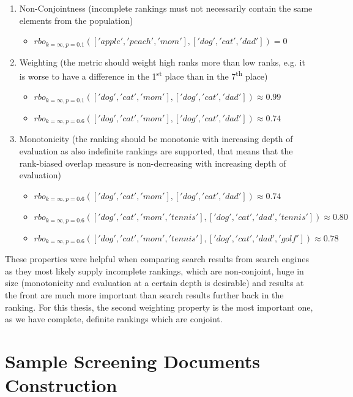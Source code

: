 \documentclass[draft,final]{thesisclass} %
\begin{document}
\begin{enumerate}
\item Non-Conjointness (incomplete rankings must not necessarily contain the same elements from the population)
\begin{itemize}
    \item $rbo_{k=\infty,p=0.1}(['apple','peach','mom'],['dog','cat','dad']) = 0$
\end{itemize}
\item Weighting (the metric should weight high ranks more than low ranks, e.g. it is worse to have a difference in the 1\textsuperscript{st} place than in the 7\textsuperscript{th} place)
\begin{itemize}
    \item $rbo_{k=\infty,p=0.1}(['dog','cat','mom'],['dog','cat','dad']) \approx 0.99$
    \item $rbo_{k=\infty,p=0.6}(['dog','cat','mom'],['dog','cat','dad']) \approx 0.74$
\end{itemize}
\item Monotonicity (the ranking should be monotonic with increasing depth of evaluation as also indefinite rankings are supported, that means that the rank-biased overlap measure is non-decreasing with increasing depth of evaluation)
\begin{itemize}
    \item $rbo_{k=\infty,p=0.6}(['dog','cat','mom'],['dog','cat','dad']) \approx 0.74$
    \item $rbo_{k=\infty,p=0.6}(['dog','cat','mom','tennis'],['dog','cat','dad','tennis']) \approx 0.80$
    \item $rbo_{k=\infty,p=0.6}(['dog','cat','mom','tennis'],['dog','cat','dad','golf']) \approx 0.78$
\end{itemize}
\end{enumerate}
These properties were helpful when comparing search results from search engines as they most likely supply incomplete rankings, which are non-conjoint, huge in size (monotonicity and evaluation at a certain depth is desirable) and results at the front are much more important than search results further back in the ranking.
For this thesis, the second weighting property is the most important one, as we have complete, definite rankings which are conjoint.

\section{Sample Screening Documents Construction}
\end{document}
